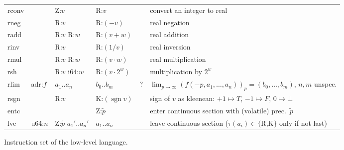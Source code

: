\documentclass[a4paper,parskip=half]{scrartcl}
\begin{document}
\begin{figure}[h]
\begin{tabular}{l|l|l|l@{\;\,\vline\,}c@{\,\vline\;\,}l}
  \hline
  \ttfamily rconv &         & Z:$v$           & R:$v$           & & convert an integer to real \\
  \ttfamily rneg  &         & R:$v$           & R:$(-v)$        & & real negation \\
  \ttfamily radd  &         & R:$v$ R:$w$     & R:$(v+w)$       & & real addition \\
  \ttfamily rinv  &         & R:$v$           & R:$(1/v)$       & & real inversion \\
  \ttfamily rmul  &         & R:$v$ R:$w$     & R:$(v\cdot w)$  & & real multiplication \\
  \ttfamily rsh   &         & R:$v$ i64:$w$   & R:$(v\cdot2^w)$ & & multiplication by $2^w$ \\
  \ttfamily rlim  & adr:$f$ & $a_1..a_n$ & $b_0..b_m$ &?& $\lim_{p\to\infty}{(f(-p,a_1,\ldots,a_n))_p} = (b_0,\ldots,b_m)$, $n,m$ unspec. \\[-1.35ex]\hline\noalign{\vspace{\dimexpr 1.35ex-.5pt}}
  \ttfamily rsgn  &         & R:$v$           & K:$(\operatorname{sgn}v)$ && sign of $v$ as kleenean: $+1\mapsto T$, $-1\mapsto F$, $0\mapsto\bot$ \\
  \hline
  \ttfamily entc  &         &                           & Z:$\tilde p$ && enter continuous section with (volatile) prec.\ $\tilde p$ \\
  \ttfamily lvc   & u64:$n$ & Z:$\tilde p$ $a_1'..a_n'$ & $a_1..a_n$   && leave continuous section ($\tau(a_i)\in\{\text{R,K}\}$ only if not last)
\end{tabular}
\caption{Instruction set of the low-level language.}
\label{fig:instrs}
\end{figure}

\restoregeometry
\newpage

\newcommand*\dom{\operatorname{dom}}
\newcommand*\Top{\operatorname{top}}
\end{document}
